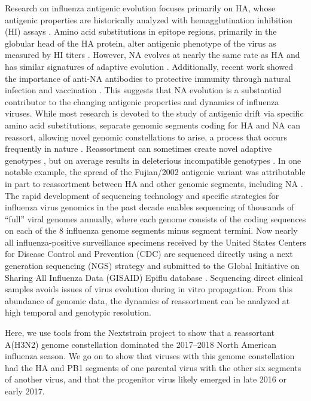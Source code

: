 Research on influenza antigenic evolution focuses primarily on HA, whose antigenic properties are historically analyzed with hemagglutination inhibition (HI) assays \citep{hirst_quantitative_1942}.
Amino acid substitutions in epitope regions, primarily in the globular head of the HA protein, alter antigenic phenotype of the virus as measured by HI titers \citep{smith_mapping_2004, koel_substitutions_2013, bedford_integrating_2014, neher_prediction_2016}.
However, NA evolves at nearly the same rate as HA and has similar signatures of adaptive evolution \citep{bhatt_genomic_2011}.
Additionally, recent work showed the importance of anti-NA antibodies to protective immunity through natural infection and vaccination \citep{monto_antibody_2015, huang_risk_2018}.
This suggests that NA evolution is a substantial contributor to the changing antigenic properties and dynamics of influenza viruses.
While most research is devoted to the study of antigenic drift via specific amino acid substitutions, separate genomic segments coding for HA and NA can reassort, allowing novel genomic constellations to arise, a process that occurs frequently in nature \citep{nelson_multiple_2008, marshall_influenza_2013}.
Reassortment can sometimes create novel adaptive genotypes \citep{neverov_intrasubtype_2014, dudas_reassortment_2015}, but on average results in deleterious incompatible genotypes \citep{rabadan_non-random_2008, villa_fitness_2017}.
In one notable example, the spread of the Fujian/2002 antigenic variant was attributable in part to reassortment between HA and other genomic segments, including NA \citep{holmes_whole_2005}.
The rapid development of sequencing technology and specific strategies for influenza virus genomics in the past decade enables sequencing of thousands of “full” viral genomes annually, where each genome consists of the coding sequences on each of the 8 influenza genome segments minus segment termini.
Now nearly all influenza-positive surveillance specimens received by the United States Centers for Disease Control and Prevention (CDC) are sequenced directly using a next generation sequencing (NGS) strategy and submitted to the Global Initiative on Sharing All Influenza Data (GISAID) Epiflu database \citep{elbe2017data}.
Sequencing direct clinical samples avoids issues of virus evolution during in vitro propagation.
From this abundance of genomic data, the dynamics of reassortment can be analyzed at high temporal and genotypic resolution.

Here, we use tools from the Nextstrain project \citep{hadfield_nextstrain_2018} to show that a reassortant A(H3N2) genome constellation dominated the 2017–2018 North American influenza season.
We go on to show that viruses with this genome constellation had the HA and PB1 segments of one parental virus with the other six segments of another virus, and that the progenitor virus likely emerged in late 2016 or early 2017.

